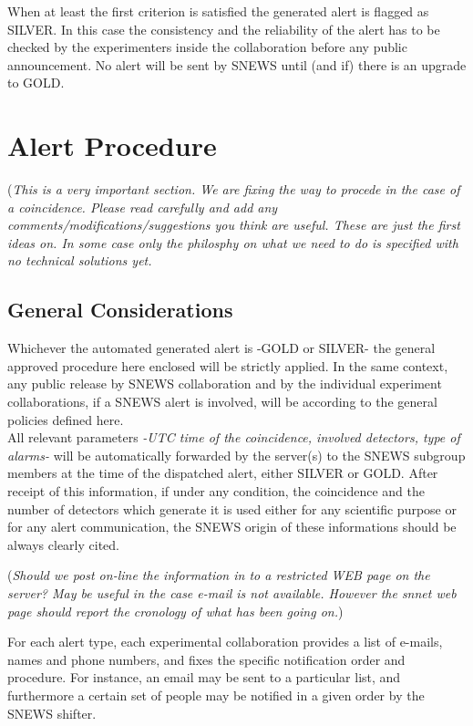 \documentclass{article}
\begin{document}
When at least the first criterion is satisfied the generated alert is
flagged as SILVER. In this case the consistency and the reliability 
of the alert has to be checked by the experimenters inside the collaboration before any public announcement. No alert will be sent by SNEWS until (and if)
there is an upgrade to GOLD.

\section{Alert Procedure}
({\it This is a very important section. We are fixing the way to procede
in the case of a coincidence. Please read carefully and add any 
comments/modifications/suggestions you think are useful. These are 
just the first ideas on. In some case  only the philosphy on what we need 
to do is specified with no technical solutions yet.}\\

\subsection{General Considerations}

Whichever the automated generated alert is -GOLD or SILVER- the
general approved procedure here enclosed will be strictly applied. In
the same context, any public release by SNEWS collaboration and by the
individual experiment collaborations, if a SNEWS alert is involved,
will be according to the general policies defined here.\\


All relevant parameters {\it -UTC
time of the coincidence, involved detectors, type of alarms-} will be
automatically forwarded by the server(s) to the SNEWS subgroup members
at the time of the dispatched alert, either SILVER or GOLD.
After receipt of this information, if under any condition,
the coincidence and the number of detectors which generate 
it is used either for any scientific purpose or for any alert
communication, the SNEWS origin of these informations
should be always clearly cited.

({\it Should we post on-line the information in to a 
restricted WEB page on the server? May be useful in the case e-mail is not available. 
However the snnet web page should report the cronology of what has been going on.})

For each alert type, each experimental collaboration 
provides a list of e-mails, names and phone numbers, and fixes
the specific
notification order and procedure. For instance, an email may
be sent to a particular list, and furthermore a certain set of
people may be notified in a given order by the SNEWS shifter.
\end{document}
